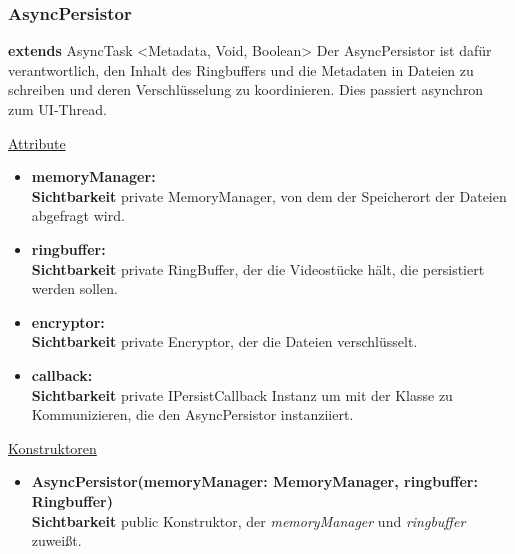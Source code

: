 \subsubsection{AsyncPersistor} \label{app:klasse:AsyncPersistor}
\textbf{extends} AsyncTask <Metadata, Void, Boolean> \newline
Der AsyncPersistor ist dafür verantwortlich, den Inhalt des Ringbuffers und die Metadaten in Dateien zu schreiben und deren Verschlüsselung zu koordinieren. Dies passiert asynchron zum UI-Thread.
\newline

\underline{Attribute}
\begin{itemize}
\itemsep0pt
\item \textbf{memoryManager: } \hfill\\ 
\textbf{Sichtbarkeit} private \newline
MemoryManager, von dem der Speicherort der Dateien abgefragt wird.

\item \textbf{ringbuffer: } \hfill\\ 
\textbf{Sichtbarkeit} private \newline
RingBuffer, der die Videostücke hält, die persistiert werden sollen.

\item \textbf{encryptor: } \hfill\\ 
\textbf{Sichtbarkeit} private \newline
Encryptor, der die Dateien verschlüsselt.

\item \textbf{callback: } \hfill\\ 
\textbf{Sichtbarkeit} private \newline
IPersistCallback Instanz um mit der Klasse zu Kommunizieren, die den AsyncPersistor instanziiert.

\end{itemize}

\underline{Konstruktoren}
\begin{itemize}
\itemsep0pt
\item \textbf{AsyncPersistor(memoryManager: MemoryManager, ringbuffer: Ringbuffer)} \hfill\\
\textbf{Sichtbarkeit} public\newline
Konstruktor, der \textit{memoryManager} und \textit{ringbuffer} zuweißt.
\end{itemize}

